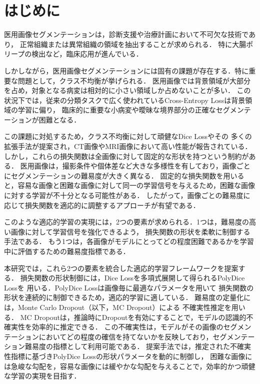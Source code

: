 \documentclass[a4paper,platex,dvipdfmx,twocolumn]{jsarticle}
\begin{document}
\twocolumn[{\maketitle}]

\section{はじめに}

医用画像セグメンテーションは，診断支援や治療計画において不可欠な技術であり，
正常組織または異常組織の領域を抽出することが求められる．
特に大腸ポリープ\cite{ji2022video}の検出など，臨床応用が進んでいる．

しかしながら，医用画像セグメンテーションには固有の課題が存在する．特に重要な問題として，クラス不均衡が挙げられる．
医用画像では背景領域が大部分を占め，対象となる病変は相対的に小さい領域しか占めないことが多い．
この状況下では，従来の分類タスクで広く使われているCross-Entropy Loss\cite{long2015fully}は背景領域の学習に偏り，
臨床的に重要な小病変や曖昧な境界部分の正確なセグメンテーションが困難となる．

この課題に対処するため，クラス不均衡に対して頑健なDice Loss\cite{milletari2016v}やその
多くの拡張手法が提案され，CT画像やMRI画像において高い性能が報告されている．
しかし，これらの損失関数は全画像に対して固定的な形状を持つという制約がある．
医用画像は，撮影条件や個体差など大きな多様性を有しており，画像ごとにセグメンテーションの難易度が大きく異なる．
固定的な損失関数を用いると，容易な画像と困難な画像に対して同一の学習信号を与えるため，困難な画像に対する学習が不十分となる可能性がある．
したがって，画像ごとの難易度に応じて損失関数を適応的に調整するアプローチが有望である．

このような適応的学習の実現には，2つの要素が求められる．1つは，難易度の高い画像に対して学習信号を強化できるよう，
損失関数の形状を柔軟に制御する手法である．
もう1つは，各画像がモデルにとってどの程度困難であるかを学習中に評価するための難易度指標である．

本研究では，これら2つの要素を統合した適応的学習フレームワークを提案する．
損失関数の形状制御には，Dice Lossを多項式展開して得られるPolyDice Loss\cite{polydice}を
用いる．PolyDice Lossは画像毎に最適なパラメータを用いて
損失関数の形状を連続的に制御できるため，適応的学習に適している．
難易度の定量化には，Monte Carlo Dropout\cite{pmlr-v48-gal16}（以下，MC Dropout）による
不確実性推定を用いる．
MC Dropoutは，推論時にDropoutを有効にすることで，モデルの認識的不確実性を効率的に推定できる．
この不確実性は，モデルがその画像のセグメンテーションにおいてどの程度の確信を持てないかを反映しており，セグメンテーション難易度の指標として利用可能である．
提案手法では，推定された不確実性指標に基づきPolyDice Lossの形状パラメータを動的に制御し，
困難な画像には急峻な勾配を，容易な画像には緩やかな勾配を与えることで，効率的かつ頑健な学習の実現を目指す．
\end{document}
